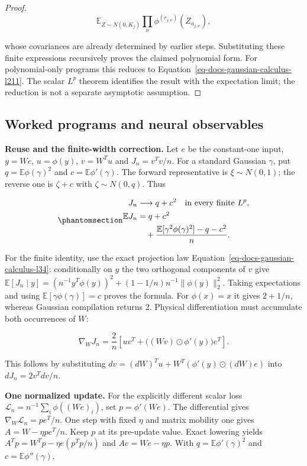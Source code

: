 \documentclass[
  11pt,
]{article}
\theoremstyle{definition}
\theoremstyle{plain}
\theoremstyle{plain}
\theoremstyle{plain}
\theoremstyle{remark}
\begin{document}
\begin{proof}
\[
\mathbb E_{Z\sim N(0,K_j)}\prod_\nu\phi^{(r_{j,\nu})}(Z_{a_{j,\nu}}),
\]

whose covariances are already determined by earlier steps. Substituting
these finite expressions recursively proves the claimed polynomial form.
For polynomial-only programs this reduces to
Equation~\ref{eq-docs-gaussian-calculus-l211}. The scalar \(L^p\)
theorem identifies the result with the expectation limit; the reduction
is not a separate asymptotic assumption.
\end{proof}

\subsection{Worked programs and neural
observables}\label{sec-mfp-worked-programs}

\textbf{Reuse and the finite-width correction.} Let \(e\) be the
constant-one input, \(y=We\), \(u=\phi(y)\), \(v=W^Tu\) and
\(J_n=v^Tv/n\). For a standard Gaussian \(\gamma\), put
\(q=\mathbb E\phi(\gamma)^2\) and \(c=\mathbb E\phi'(\gamma)\). The
forward representative is \(\xi\sim N(0,1)\); the reverse one is
\(\zeta+c\) with \(\zeta\sim N(0,q)\). Thus

\begin{equation}\protect\phantomsection\label{eq-mfp-reuse-square}{
\begin{aligned}
J_n&\longrightarrow q+c^2\quad\text{in every finite }L^p,\\
\mathbb E J_n&=q+c^2\\
&\quad+\frac{\mathbb E[\gamma^2\phi(\gamma)^2]-q-c^2}{n}.
\end{aligned}
}\end{equation}

For the finite identity, use the exact projection law
Equation~\ref{eq-docs-gaussian-calculus-l34}: conditionally on \(y\) the
two orthogonal components of \(v\) give
\(\mathbb E[J_n\mid y]=(n^{-1}y^T\phi(y))^2+
(1-1/n)n^{-1}\|\phi(y)\|_2^2\). Taking expectations and using
\(\mathbb E[\gamma\phi(\gamma)]=c\) proves the formula. For
\(\phi(x)=x\) it gives \(2+1/n\), whereas Gaussian compilation returns
\(2\). Physical differentiation must accumulate both occurrences of
\(W\):

\[
\nabla_WJ_n=\frac2n\left[
uv^T+\bigl((Wv)\odot\phi'(y)\bigr)e^T\right].
\]

This follows by substituting \(dv=(dW)^Tu+W^T(\phi'(y)\odot(dW)e)\) into
\(dJ_n=2v^Tdv/n\).

\textbf{One normalized update.} For the explicitly different scalar loss
\(\mathcal L_n=n^{-1}\sum_i\phi((We)_i)\), set \(p=\phi'(We)\). The
differential gives \(\nabla_W\mathcal L_n=pe^T/n\). One step with fixed
\(\eta\) and matrix mobility one gives \(A=W-\eta pe^T/n\). Keep \(p\)
at its pre-update value. Exact lowering yields
\(A^Tp=W^Tp-\eta e(p^Tp/n)\) and \(Ae=We-\eta p\). With
\(q=\mathbb E\phi'(\gamma)^2\) and \(c=\mathbb E\phi''(\gamma)\),
\end{document}
